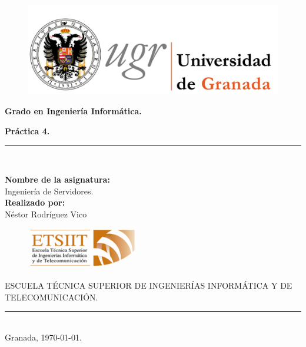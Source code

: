 \documentclass[a4paper,titlepage,12pt]{scrartcl}	%
\numberwithin{figure}{section} %
\numberwithin{table}{section} %
\begin{document}
	\lstset{inputencoding=utf8/latin1} %
	\begin{titlepage}
		\begin{center}
			\begin{figure}[htb]
				\begin{center}
					\includegraphics[width=12cm]{./Portada/ugr.png}
				\end{center}
			\end{figure}

			\vspace*{0.8cm}
			\begin{Large}
				\textbf{Grado en Ingeniería Informática.}\\
			\end{Large}
			\begin{Huge}
				\vspace{1.5cm}
				\textbf{Práctica 4.} \\
			\end{Huge}
			\vspace*{0.76cm}
			\rule{100mm}{0.1mm}\\
			\vspace*{0.5cm}
			\begin{large}
				\textbf{Nombre de la asignatura:}\\
				Ingeniería de Servidores.\\
				\vspace*{0.5cm}
				\textbf{Realizado por:}\\
				Néstor Rodríguez Vico \\

				\vspace*{2cm}
				\begin{figure}[htb]
					\begin{center}
						\includegraphics[width=5cm]{./Portada/etsiit.png}
					\end{center}
				\end{figure}
				\vspace*{-0.6cm}
				ESCUELA TÉCNICA SUPERIOR DE INGENIERÍAS INFORMÁTICA Y DE TELECOMUNICACIÓN.\\
				\rule{20mm}{0.1mm}\\
				\vspace*{0.6cm}
				Granada, \today.
			\end{large}
		\end{center}
	\end{titlepage}
	
\end{document}
